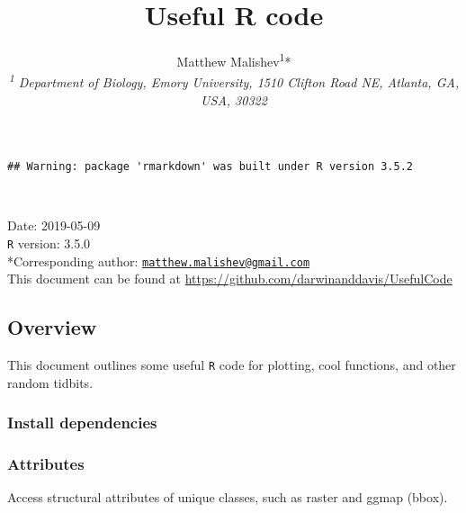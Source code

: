 \documentclass[10,portrait]{article}
\title{Useful R code}
\author{Matthew
Malishev\textsuperscript{1}*\\[2\baselineskip]\emph{\textsuperscript{1}
Department of Biology, Emory University, 1510 Clifton Road NE, Atlanta,
GA, USA, 30322}}
\date{}
\newenvironment{Shaded}{\begin{snugshade}}{\end{snugshade}}
\newcommand{\KeywordTok}[1]{\textcolor[rgb]{0.13,0.29,0.53}{\textbf{#1}}}
\newcommand{\DataTypeTok}[1]{\textcolor[rgb]{0.13,0.29,0.53}{#1}}
\newcommand{\DecValTok}[1]{\textcolor[rgb]{0.00,0.00,0.81}{#1}}
\newcommand{\StringTok}[1]{\textcolor[rgb]{0.31,0.60,0.02}{#1}}
\newcommand{\CommentTok}[1]{\textcolor[rgb]{0.56,0.35,0.01}{\textit{#1}}}
\newcommand{\OperatorTok}[1]{\textcolor[rgb]{0.81,0.36,0.00}{\textbf{#1}}}
\newcommand{\NormalTok}[1]{#1}
\begin{document}
\maketitle

{
\hypersetup{linkcolor=black}
\setcounter{tocdepth}{4}
\tableofcontents
}
\begin{verbatim}
## Warning: package 'rmarkdown' was built under R version 3.5.2
\end{verbatim}

~

Date: 2019-05-09\\
\texttt{R} version: 3.5.0\\
*Corresponding author:
\href{mailto:matthew.malishev@gmail.com}{\nolinkurl{matthew.malishev@gmail.com}}\\
This document can be found at
\url{https://github.com/darwinanddavis/UsefulCode}

\newpage  

\subsection{Overview}\label{overview}

This document outlines some useful \texttt{R} code for plotting, cool
functions, and other random tidbits.

\subsubsection{Install dependencies}\label{install-dependencies}

\subsubsection{Attributes}\label{attributes}

Access structural attributes of unique classes, such as raster and ggmap
(bbox).

\begin{Shaded}
\end{Shaded}
\end{document}
